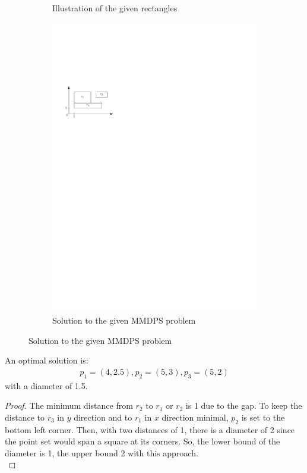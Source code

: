 \documentclass[a4paper,12pt,headsepline]{scrartcl}
\begin{document}
\begin{enumerate}[a)]
\begin{figure}[H]
\begin{subfigure}{0.48\textwidth}
			\caption*{Illustration of the given rectangles}
		\end{subfigure}
		\begin{subfigure}{0.48\textwidth}
			\centering
			\includegraphics[width=1\linewidth,page=2]{graphics/7_2.pdf}
			\caption*{Solution to the given MMDPS problem}
		\end{subfigure}
	\end{figure}
An optimal solution is:
\begin{align*}
	p_1 = (4,2.5), p_2 = (5,3), p_3 = (5,2)
\end{align*}
with a diameter of 1.5.
\begin{proof}
	The minimum distance from $r_2$ to $r_1$ or $r_2$ is 1 due to the gap. To keep the distance to $r_3$ in $y$ direction and to $r_1$ in $x$ direction minimal, $p_2$ is set to the bottom left corner. Then, with two distances of 1, there is a diameter of 2 since the point set would span a square at its corners. So, the lower bound of the diameter is 1, the upper bound 2 with this approach.\\

\end{proof}
\end{enumerate}
\end{document}
